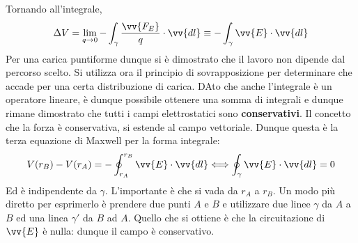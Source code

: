 \documentclass[a4paper, oneside]{article}
\begin{document}
Tornando all'integrale, 
\begin{gather*}
    \Delta V = \lim_{q \to 0} -\int_{\gamma} \frac{\vv{F_E} }{q}  \cdot \vv{dl} \equiv -\int_{\gamma} \vv{E} \cdot \vv{dl}   
\end{gather*}
Per una carica puntiforme dunque si è dimostrato che il lavoro non dipende dal percorso scelto. Si utilizza
ora il principio di sovrapposizione per determinare che accade per una certa distribuzione 
di carica. DAto che anche l'integrale è un operatore lineare, è dunque possibile ottenere 
una somma di integrali e dunque rimane dimostrato che tutti i campi elettrostatici sono 
\textbf{conservativi}. Il concetto che la forza è conservativa, si estende al campo
vettoriale. Dunque questa è la terza equazione di Maxwell per la forma integrale: 
\begin{align}
    V(r_B) - V(r_A) = -\oint_{r_A}^{r_B} \vv{E} \cdot \vv{dl}  \Longleftrightarrow \oint_{\gamma} \vv{E} \cdot \vv{dl} = 0  
\end{align}
Ed è indipendente da $\gamma$. L'importante è che si vada da $r_A$ a $r_B$. Un modo più diretto per 
esprimerlo è prendere due punti $A$ e $B$ e utilizzare due linee $\gamma$ da $A$ a $B$
ed una linea $\gamma'$ da $B$ ad $A$. Quello che si ottiene è che la circuitazione di $\vv{E}$ è nulla:
dunque il campo è conservativo. 
\end{document}
